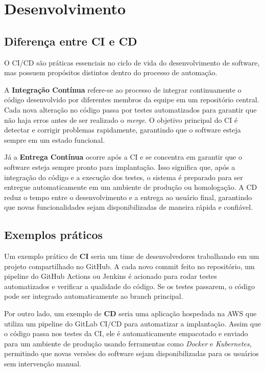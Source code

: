 \documentclass[a4paper,12pt]{article}
\begin{document}
\section*{Desenvolvimento}

\subsection*{Diferença entre CI e CD}
O CI/CD são práticas essenciais no ciclo de vida do desenvolvimento de software, mas possuem propósitos distintos dentro do processo de automação.  

A \textbf{Integração Contínua } refere-se ao processo de integrar continuamente o código desenvolvido por diferentes membros da equipe em um repositório central. Cada nova alteração no código passa por testes automatizados para garantir que não haja erros antes de ser realizado o \textit{merge}. O objetivo principal do CI é detectar e corrigir problemas rapidamente, garantindo que o software esteja sempre em um estado funcional.  

Já a \textbf{Entrega Contínua} ocorre após a CI e se concentra em garantir que o software esteja sempre pronto para implantação. Isso significa que, após a integração do código e a execução dos testes, o sistema é preparado para ser entregue automaticamente em um ambiente de produção ou homologação. A CD reduz o tempo entre o desenvolvimento e a entrega ao usuário final, garantindo que novas funcionalidades sejam disponibilizadas de maneira rápida e confiável.  

\subsection*{Exemplos práticos}  
Um exemplo prático de \textbf{CI} seria um time de desenvolvedores trabalhando em um projeto compartilhado no GitHub. A cada novo commit feito no repositório, um pipeline do GitHub Actions ou Jenkins é acionado para rodar testes automatizados e verificar a qualidade do código. Se os testes passarem, o código pode ser integrado automaticamente ao branch principal.  

Por outro lado, um exemplo de \textbf{CD} seria uma aplicação hospedada na AWS que utiliza um pipeline do GitLab CI/CD para automatizar a implantação. Assim que o código passa nos testes da CI, ele é automaticamente empacotado e enviado para um ambiente de produção usando ferramentas como \textit{Docker} e \textit{Kubernetes}, permitindo que novas versões do software sejam disponibilizadas para os usuários sem intervenção manual.  
\end{document}

